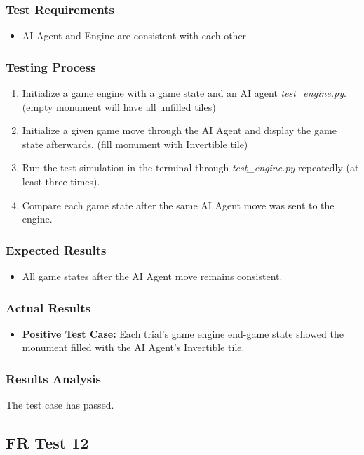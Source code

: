 \documentclass[12pt, titlepage]{article}
\begin{document}
\subsubsection{Test Requirements}
\begin{itemize}
    \item AI Agent and Engine are consistent with each other
\end{itemize}
\subsubsection{Testing Process}
\begin{enumerate}
    \item Initialize a game engine with a game state and an AI agent \textit{test\_engine.py}. (empty monument will have all unfilled tiles)
    \item Initialize a given game move through the AI Agent and display the game state afterwards. (fill monument with Invertible tile)
    \item Run the test simulation in the terminal through \textit{test\_engine.py} repeatedly (at least three times).
    \item Compare each game state after the same AI Agent move was sent to the engine.
\end{enumerate}
\subsubsection{Expected Results}
\begin{itemize}
    \item All game states after the AI Agent move remains consistent.
\end{itemize}
\subsubsection{Actual Results}
\begin{itemize}
    \item \textbf{Positive Test Case:} Each trial's game engine end-game state showed the monument filled with the AI Agent's Invertible tile.
\end{itemize}
\subsubsection{Results Analysis}
The test case has passed.

\subsection{FR Test 12}
\end{document}
